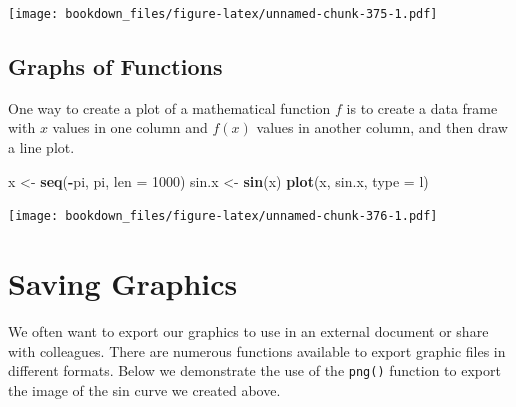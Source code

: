 \documentclass[
]{krantz}
\makeatletter
\newenvironment{Shaded}{\begin{snugshade}}{\end{snugshade}}
\newcommand{\DataTypeTok}[1]{\textcolor[rgb]{0.27,0.27,0.27}{#1}}
\newcommand{\DecValTok}[1]{\textcolor[rgb]{0.06,0.06,0.06}{#1}}
\newcommand{\KeywordTok}[1]{\textcolor[rgb]{0.27,0.27,0.27}{\textbf{#1}}}
\newcommand{\NormalTok}[1]{#1}
\newcommand{\OperatorTok}[1]{\textcolor[rgb]{0.43,0.43,0.43}{\textbf{#1}}}
\newcommand{\StringTok}[1]{\textcolor[rgb]{0.5,0.5,0.5}{#1}}
\newenvironment{kframe}{%
\medskip{}
\setlength{\fboxsep}{.8em}
 \def\at@end@of@kframe{}%
 \ifinner\ifhmode%
  \def\at@end@of@kframe{\end{minipage}}%
  \begin{minipage}{\columnwidth}%
 \fi\fi%
 \def\FrameCommand##1{\hskip\@totalleftmargin \hskip-\fboxsep
 \colorbox{shadecolor}{##1}\hskip-\fboxsep
     \hskip-\linewidth \hskip-\@totalleftmargin \hskip\columnwidth}%
 \MakeFramed {\advance\hsize-\width
   \@totalleftmargin\z@ \linewidth\hsize
   \@setminipage}}%
 {\par\unskip\endMakeFramed%
 \at@end@of@kframe}
\renewenvironment{Shaded}{\begin{kframe}}{\end{kframe}}
\makeatother
\begin{document}
\begin{Shaded}
\end{Shaded}

\texttt{[image: bookdown\_files/figure-latex/unnamed-chunk-375-1.pdf]}

\hypertarget{graphics11}{%
\subsection{Graphs of Functions}\label{graphics11}}

One way to create a plot of a mathematical function \(f\) is to create a data frame with \(x\) values in one column and \(f(x)\) values in another column, and then draw a line plot.

\begin{Shaded}
\begin{Highlighting}[]
\NormalTok{x \textless{}{-}}\StringTok{ }\KeywordTok{seq}\NormalTok{(}\OperatorTok{{-}}\NormalTok{pi, pi, }\DataTypeTok{len =} \DecValTok{1000}\NormalTok{)}
\NormalTok{sin.x \textless{}{-}}\StringTok{ }\KeywordTok{sin}\NormalTok{(x)}
\KeywordTok{plot}\NormalTok{(x, sin.x, }\DataTypeTok{type =} \StringTok{\textquotesingle{}l\textquotesingle{}}\NormalTok{)}
\end{Highlighting}
\end{Shaded}

\texttt{[image: bookdown\_files/figure-latex/unnamed-chunk-376-1.pdf]}

\hypertarget{graphics12}{%
\section{Saving Graphics}\label{graphics12}}

We often want to export our graphics to use in an external document or share with colleagues. There are numerous functions available to export graphic files in different formats. Below we demonstrate the use of the \texttt{png()} function to export the image of the sin curve we created above.
\end{document}
